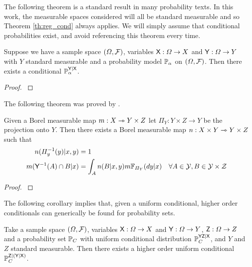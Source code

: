 The following theorem is a standard result in many probability texts. In this work, the measurable spaces considered will all be standard measurable and so Theorem \ref{th:reg_cond} always applies. We will simply assume that conditional probabilities exist, and avoid referencing this theorem every time.

\begin{theorem}\label{th:reg_cond}
Suppose we have a sample space $(\Omega,\mathcal{F})$, variables $\mathsf{X}:\Omega\to X$ and $\mathsf{Y}:\Omega\to Y$ with $Y$ standard measurable and a probability model $\mathbb{P}_{\alpha}$ on $(\Omega,\mathcal{F})$. Then there exists a conditional $\mathbb{P}_\alpha^{\mathsf{Y}|\mathsf{X}}$.
\end{theorem}

\begin{proof}
\citet[Theorem 2.18]{cinlar_probability_2011}
\end{proof}

The following theorem was proved by \citet{bogachev_kantorovich_2020}.

\begin{theorem}\label{th:bogachev}
Given a Borel measurable map $m:X\rightarrowtriangle Y\times Z$ let $\Pi_Y:Y\times Z\to Y$ be the projection onto $Y$. Then there exists a Borel measurable map $n:X\times Y\rightarrowtriangle Y\times Z$ such that 
\begin{align}
    n(\Pi_y^{-1}(y)|x,y) &= 1\label{eq:proper}\\
    m(\mathsf{Y}^{-1}(A)\cap B|x) &= \int_A n(B|x,y) m\mathbb{F}_{\Pi_Y}(dy|x)&\forall A\in \mathcal{Y},B\in\mathcal{Y\times Z}\label{eq:conditional1}
\end{align}
\end{theorem}

\begin{proof}
 \citet[Theorem 3.5]{bogachev_kantorovich_2020}
\end{proof}

The following corollary implies that, given a uniform conditional, higher order conditionals can generically be found for probability sets.

\begin{corollary}\label{th:ho_cond_psets}
Take a sample space $(\Omega,\mathcal{F})$, variables $\mathsf{X}:\Omega\to X$ and $\mathsf{Y}:\Omega\to Y$, $\mathsf{Z}:\Omega\to Z$ and a probability set $\mathbb{P}_C$ with uniform conditional distribution $\mathbb{P}_C^{\mathsf{YZ}|\mathsf{X}}$, and $Y$ and $Z$ standard measurable. Then there exists a higher order uniform conditional $\mathbb{P}_C^{\mathsf{Z}|(\mathsf{Y}|\mathsf{X})}$.
\end{corollary}

